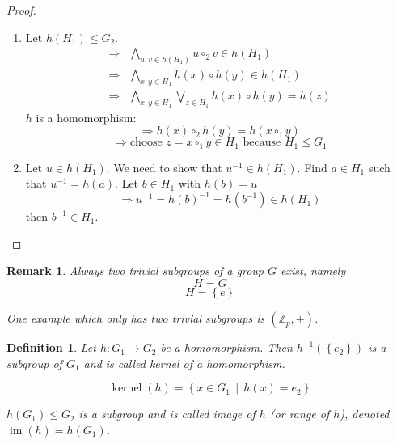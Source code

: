 \documentclass[a4paper,landscape,twocolumn]{article}
\newcommand\set[1]{\left\{#1\right\}}
\newcommand\setdef[2]{\left\{#1\,\middle|\,#2\right\}}
\newtheorem{defi}{Definition}
\newtheorem{rem}{Remark}
\begin{document}
\begin{proof}
  \begin{enumerate}
    \item
      Let $h(H_1) \leq G_2$.
      \begin{align*}
        \Rightarrow & \bigwedge_{u,v \in h(H_1)} u \circ_2 v \in h(H_1) \\
        \Rightarrow & \bigwedge_{x,y \in H_1} h(x) \circ h(y) \in h(H_1) \\
        \Rightarrow & \bigwedge_{x,y \in H_1} \bigvee_{z \in H_1} h(x) \circ h(y) = h(z)
      \end{align*}
      $h$ is a homomorphism:
      \[ \Rightarrow h(x) \circ_2 h(y) = h(x \circ_1 y) \]
      \[ \Rightarrow \text{choose } z = x \circ_1 y \in H_1 \text{ because } H_1 \leq G_1 \]
    \item
      Let $u \in h(H_1)$. We need to show that $u^{-1} \in h(H_1)$.
      Find $a \in H_1$ such that $u^{-1} = h(a)$.
      Let $b \in H_1$ with $h(b) = u$
      \[ \Rightarrow u^{-1} = h(b)^{-1} = h(b^{-1}) \in h(H_1) \]
      then $b^{-1} \in H_1$.
  \end{enumerate}
\end{proof}

\begin{rem}
  Always two \emph{trivial subgroups} of a group $G$ exist, namely
  \[ H = G \]
  \[ H = \set{e} \]

  One example which only has two trivial subgroups is $(\mathbb Z_p, +)$.
\end{rem}

\begin{defi}
  Let $h: G_1 \rightarrow G_2$ be a homomorphism.
  Then $h^{-1}(\set{e_2})$ is a subgroup of $G_1$
  and is called \emph{kernel} of a homomorphism.

  \[ \operatorname{kernel}(h) = \setdef{x \in G_1}{h(x) = e_2} \]

  $h(G_1) \leq G_2$ is a subgroup and is called \emph{image of $h$} (or \emph{range of $h$}),
  denoted $\operatorname{im}(h) = h(G_1)$.
\end{defi}
\end{document}
